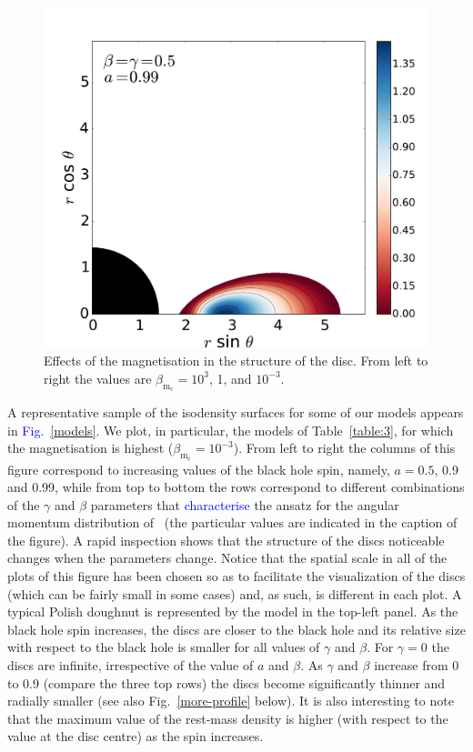 \documentclass{aa}
\newcommand{\sg}[1]{\textcolor{blue}{#1}}
\begin{document}
\begin{figure}[t]
\includegraphics[scale=0.14]{figures/fig3c.pdf}
\caption{Effects of the magnetisation in the structure of the disc. From left to right the values are $\beta_{\mathrm{m}_{\mathrm{c}}}
=10^3$, 1, and $10^{-3}$.}
\label{magnetisation}%
\end{figure}

A representative sample of the isodensity surfaces for some of our models appears in \sg{Fig.}~\ref{models}. We plot, in particular, the models of Table~\ref{table:3}, for which the magnetisation is highest ($\beta_{\mathrm{m}_{\mathrm{c}}}=10^{-3}$). From left to right the columns of this figure correspond to increasing values of the black hole spin, namely, $a=0.5$, 0.9 and 0.99, while from top to bottom the rows correspond to different combinations of the $\gamma$ and $\beta$ parameters that \sg{characterise} the ansatz for the angular momentum distribution of~\citet{Qian:2009} (the particular values are indicated in the caption of the figure).  A rapid inspection shows that the structure of the discs noticeable changes when the parameters change. Notice that the spatial scale in all of the plots of this figure has been chosen so as to facilitate the visualization of the discs (which can be fairly small in some cases) and, as such, is different in each plot. A typical Polish doughnut is represented by the model in the top-left panel. As the black hole spin increases, the discs are closer to the black hole and its relative size with respect to the black hole is smaller for all values of $\gamma$ and $\beta$. For $\gamma=0$ the discs are infinite, irrespective of the value of $a$ and $\beta$. As $\gamma$ and $\beta$ increase from 0 to 0.9 (compare the three top rows) the discs become significantly thinner and radially smaller (see also Fig.~\ref{more-profile} below). It is also interesting to note that the maximum value of the rest-mass density is higher (with respect to the value at the disc centre) as the spin increases.
\end{document}
